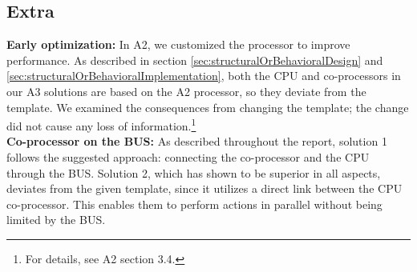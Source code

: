 \subsection{Extra}

\textbf{Early optimization:} In A2, we customized the processor to improve performance. As described in section \ref{sec:structuralOrBehavioralDesign} and \ref{sec:structuralOrBehavioralImplementation}, both the CPU and co-processors in our A3 solutions are based on the A2 processor, so they deviate from the template. We examined the consequences from changing the template; the change did not cause any loss of information.\footnote{For details, see A2 section 3.4.} \\

\textbf{Co-processor on the BUS:} As described throughout the report, solution 1 follows the suggested approach: connecting the co-processor and the CPU through the BUS. Solution 2, which has shown to be superior in all aspects, deviates from the given template, since it utilizes a direct link between the CPU co-processor. This enables them to perform actions in parallel without being limited by the BUS. 

